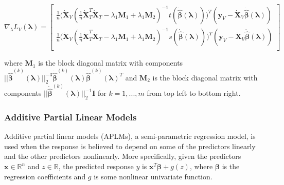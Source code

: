 \documentclass[10pt,letterpaper]{article}
\begin{document}
\begin{equation}
\nabla_\lambda L_V(\boldsymbol{\lambda}) =
\begin{bmatrix}
\frac{1}{n}
\Bigg (
\dot{\boldsymbol{X}}_V
(\frac{1}{n} \dot{\boldsymbol{X}}_T^T \dot{\boldsymbol{X}}_T - \lambda_1 \boldsymbol{M}_1 + \lambda_1 \boldsymbol{M}_2)^{-1}
t(\dot{\hat{\boldsymbol{\beta}}}(\boldsymbol{\lambda}))
\Bigg )^T
(\boldsymbol{y}_V - \dot{\boldsymbol{X}}_V \dot{\hat{\boldsymbol{\beta}}}(\boldsymbol{\lambda}))
 \\
\frac{1}{n}
\Bigg (\dot{\boldsymbol{X}}_V
(\frac{1}{n} \dot{\boldsymbol{X}}_T^T \dot{\boldsymbol{X}}_T - \lambda_1 \boldsymbol{M}_1 + \lambda_1 \boldsymbol{M}_2)^{-1}
s(\dot{\hat{\boldsymbol{\beta}}}(\boldsymbol{\lambda}))
\Bigg )^T
(\boldsymbol{y}_V - \dot{\boldsymbol{X}}_V \dot{\hat{\boldsymbol{\beta}}}(\boldsymbol{\lambda}))
\\ 
\end{bmatrix}
\end{equation}

where $\boldsymbol{M}_1$ is the block diagonal matrix with  components 
$
|| \dot{\hat{\boldsymbol{\beta}}}^{(k)}(\boldsymbol{\lambda})||_2^{-3} \dot{\hat{\boldsymbol{\beta}}}^{(k)}(\boldsymbol{\lambda}) \dot{\hat{\boldsymbol{\beta}}}^{(k)}(\boldsymbol{\lambda})^T
$ and $\boldsymbol{M}_2$ is the block diagonal matrix with components
$||\dot{\hat{\boldsymbol{\beta}}}^{(k)}(\boldsymbol{\lambda})||_2^{-1} \boldsymbol{I}$
for $k = 1, ..., m$ 
from top left to bottom right.

\subsubsection{Additive Partial Linear Models}

Additive partial linear models (APLMs), a semi-parametric regression model, is used when the response is believed to depend on some of the predictors linearly and the other predictors nonlinearly. More specifically, given the predictors $\boldsymbol x \in \mathbb{R}^{n}$ and $z \in \mathbb{R}$, the predicted response $y$ is $\boldsymbol x^T\boldsymbol \beta + g(z)$, where $\boldsymbol \beta$ is the regression coefficients and $g$ is some nonlinear univariate function.
\end{document}
